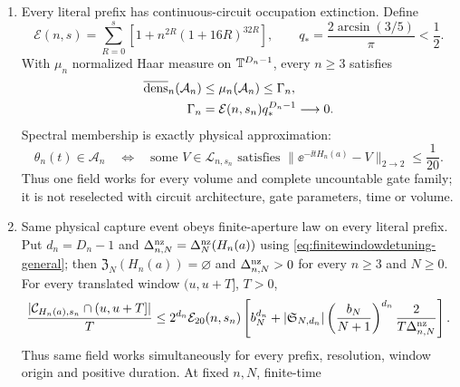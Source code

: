 \begin{theorem}
\begin{enumerate}[leftmargin=1.7em]
      Thus $t_+$ is a literal first re-entry after $t_-$ into closed
      $1/20$ circuit tube, and such excursions occur after every starting
      epoch.
\item Every literal prefix has continuous-circuit occupation extinction.
      Define
      \begin{equation}
       \mathcal E(n,s)=\sum_{R=0}^{s}
       \left[1+n^{2R}(1+16R)^{32R}\right],\qquad
       q_* =\frac{2\arcsin(3/5)}{\pi}<\frac12 .       \label{eq:samefieldentropy}
      \end{equation}
      With $\mu_n$ normalized Haar measure on $\mathbb T^{D_n-1}$, every $n\ge3$
      satisfies
      \begin{align}
       \overline{\operatorname{dens}}_n(\mathcal A_n)&\le\mu_n(\mathcal A_n)
       \le\Gamma_n,                                  \label{eq:samefieldplateau}\\
       \Gamma_n&=\mathcal E(n,s_n)q_*^{D_n-1}
       \longrightarrow0.                              \label{eq:samefieldplateaucost}
      \end{align}
      Spectral membership is exactly physical approximation:
      \begin{equation}
       \theta_n(t)\in\mathcal A_n\quad\Longleftrightarrow\quad
       \text{some }V\in\mathcal L_{n,s_n}\text{ satisfies }
       \|\ee^{-\ii tH_n(a)}-V\|_{2\to2}\le\frac1{20}. \label{eq:samefieldphysicalcapture}
      \end{equation}
      Thus one field works for every volume and complete uncountable gate
      family; it is not reselected with circuit architecture, gate
      parameters, time or volume.
\item Same physical capture event obeys finite-aperture law on every literal
      prefix.  Put $d_n=D_n-1$ and
      $\Delta_{n,N}^{\rm nz}=\Delta_N^{\rm nz}(H_n(a))$ using
      \eqref{eq:finitewindowdetuning-general}; then
      $\mathfrak Z_N(H_n(a))=\varnothing$ and
      $\Delta_{n,N}^{\rm nz}>0$ for every $n\ge3$ and $N\ge0$.  For every translated
      window $(u,u+T]$, $T>0$,
      \begin{equation}
       \frac{|\mathcal C_{H_n(a),s_n}\cap(u,u+T]|}{T}
       \le 2^{d_n}\mathcal E_{20}(n,s_n)
       \left[b_N^{d_n}+|\mathfrak S_{N,d_n}|
       \left(\frac{b_N}{N+1}\right)^{d_n}
       \frac{2}{T\Delta_{n,N}^{\rm nz}}\right].                \label{eq:samefieldfinitewindow}
      \end{equation}
      Thus same field works simultaneously for every prefix, resolution,
      window origin and positive duration.  At fixed $n,N$, finite-time

\end{enumerate}
\end{theorem}
